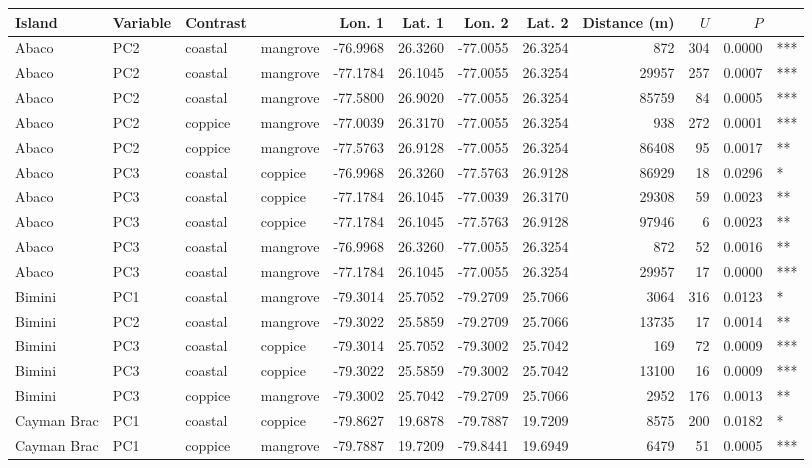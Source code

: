 
\begin{tabular}{llllrrrrrrrl}
\toprule
Island & Variable & Contrast &  & Lon. 1 & Lat. 1 & Lon. 2 & Lat. 2 & Distance (m) & $U$ & $P$ & \\
\midrule
Abaco & PC2 & coastal & mangrove & -76.9968 & 26.3260 & -77.0055 & 26.3254 & 872 & 304 & 0.0000 & ***\\
Abaco & PC2 & coastal & mangrove & -77.1784 & 26.1045 & -77.0055 & 26.3254 & 29957 & 257 & 0.0007 & ***\\
Abaco & PC2 & coastal & mangrove & -77.5800 & 26.9020 & -77.0055 & 26.3254 & 85759 & 84 & 0.0005 & ***\\
Abaco & PC2 & coppice & mangrove & -77.0039 & 26.3170 & -77.0055 & 26.3254 & 938 & 272 & 0.0001 & ***\\
Abaco & PC2 & coppice & mangrove & -77.5763 & 26.9128 & -77.0055 & 26.3254 & 86408 & 95 & 0.0017 & **\\
Abaco & PC3 & coastal & coppice & -76.9968 & 26.3260 & -77.5763 & 26.9128 & 86929 & 18 & 0.0296 & *\\
Abaco & PC3 & coastal & coppice & -77.1784 & 26.1045 & -77.0039 & 26.3170 & 29308 & 59 & 0.0023 & **\\
Abaco & PC3 & coastal & coppice & -77.1784 & 26.1045 & -77.5763 & 26.9128 & 97946 & 6 & 0.0023 & **\\
Abaco & PC3 & coastal & mangrove & -76.9968 & 26.3260 & -77.0055 & 26.3254 & 872 & 52 & 0.0016 & **\\
Abaco & PC3 & coastal & mangrove & -77.1784 & 26.1045 & -77.0055 & 26.3254 & 29957 & 17 & 0.0000 & ***\\
Bimini & PC1 & coastal & mangrove & -79.3014 & 25.7052 & -79.2709 & 25.7066 & 3064 & 316 & 0.0123 & *\\
Bimini & PC2 & coastal & mangrove & -79.3022 & 25.5859 & -79.2709 & 25.7066 & 13735 & 17 & 0.0014 & **\\
Bimini & PC3 & coastal & coppice & -79.3014 & 25.7052 & -79.3002 & 25.7042 & 169 & 72 & 0.0009 & ***\\
Bimini & PC3 & coastal & coppice & -79.3022 & 25.5859 & -79.3002 & 25.7042 & 13100 & 16 & 0.0009 & ***\\
Bimini & PC3 & coppice & mangrove & -79.3002 & 25.7042 & -79.2709 & 25.7066 & 2952 & 176 & 0.0013 & **\\
Cayman Brac & PC1 & coastal & coppice & -79.8627 & 19.6878 & -79.7887 & 19.7209 & 8575 & 200 & 0.0182 & *\\
Cayman Brac & PC1 & coppice & mangrove & -79.7887 & 19.7209 & -79.8441 & 19.6949 & 6479 & 51 & 0.0005 & ***\\

\end{tabular}
